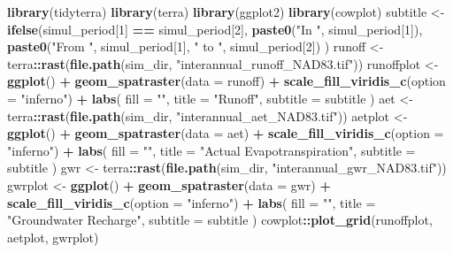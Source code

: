 \documentclass[
]{book}
\newenvironment{Shaded}{\begin{snugshade}}{\end{snugshade}}
\newcommand{\AttributeTok}[1]{\textcolor[rgb]{0.13,0.29,0.53}{#1}}
\newcommand{\DecValTok}[1]{\textcolor[rgb]{0.00,0.00,0.81}{#1}}
\newcommand{\FunctionTok}[1]{\textcolor[rgb]{0.13,0.29,0.53}{\textbf{#1}}}
\newcommand{\NormalTok}[1]{#1}
\newcommand{\OtherTok}[1]{\textcolor[rgb]{0.56,0.35,0.01}{#1}}
\newcommand{\SpecialCharTok}[1]{\textcolor[rgb]{0.81,0.36,0.00}{\textbf{#1}}}
\newcommand{\StringTok}[1]{\textcolor[rgb]{0.31,0.60,0.02}{#1}}
\begin{document}
\begin{Shaded}
\begin{Highlighting}[]
\FunctionTok{library}\NormalTok{(tidyterra)}
\FunctionTok{library}\NormalTok{(terra)}
\FunctionTok{library}\NormalTok{(ggplot2)}
\FunctionTok{library}\NormalTok{(cowplot)}
\NormalTok{subtitle }\OtherTok{\textless{}{-}} \FunctionTok{ifelse}\NormalTok{(simul\_period[}\DecValTok{1}\NormalTok{] }\SpecialCharTok{==}\NormalTok{ simul\_period[}\DecValTok{2}\NormalTok{],}
  \FunctionTok{paste0}\NormalTok{(}\StringTok{"In "}\NormalTok{, simul\_period[}\DecValTok{1}\NormalTok{]),}
  \FunctionTok{paste0}\NormalTok{(}\StringTok{"From "}\NormalTok{, simul\_period[}\DecValTok{1}\NormalTok{], }\StringTok{" to "}\NormalTok{, simul\_period[}\DecValTok{2}\NormalTok{])}
\NormalTok{)}
\NormalTok{runoff }\OtherTok{\textless{}{-}}\NormalTok{ terra}\SpecialCharTok{::}\FunctionTok{rast}\NormalTok{(}\FunctionTok{file.path}\NormalTok{(sim\_dir, }\StringTok{"interannual\_runoff\_NAD83.tif"}\NormalTok{))}
\NormalTok{runoffplot }\OtherTok{\textless{}{-}} \FunctionTok{ggplot}\NormalTok{() }\SpecialCharTok{+}
  \FunctionTok{geom\_spatraster}\NormalTok{(}\AttributeTok{data =}\NormalTok{ runoff) }\SpecialCharTok{+}
  \FunctionTok{scale\_fill\_viridis\_c}\NormalTok{(}\AttributeTok{option =} \StringTok{"inferno"}\NormalTok{) }\SpecialCharTok{+}
  \FunctionTok{labs}\NormalTok{(}
    \AttributeTok{fill =} \StringTok{""}\NormalTok{,}
    \AttributeTok{title =} \StringTok{"Runoff"}\NormalTok{,}
    \AttributeTok{subtitle =}\NormalTok{ subtitle}
\NormalTok{  )}
\NormalTok{aet }\OtherTok{\textless{}{-}}\NormalTok{ terra}\SpecialCharTok{::}\FunctionTok{rast}\NormalTok{(}\FunctionTok{file.path}\NormalTok{(sim\_dir, }\StringTok{"interannual\_aet\_NAD83.tif"}\NormalTok{))}
\NormalTok{aetplot }\OtherTok{\textless{}{-}} \FunctionTok{ggplot}\NormalTok{() }\SpecialCharTok{+}
  \FunctionTok{geom\_spatraster}\NormalTok{(}\AttributeTok{data =}\NormalTok{ aet) }\SpecialCharTok{+}
  \FunctionTok{scale\_fill\_viridis\_c}\NormalTok{(}\AttributeTok{option =} \StringTok{"inferno"}\NormalTok{) }\SpecialCharTok{+}
  \FunctionTok{labs}\NormalTok{(}
    \AttributeTok{fill =} \StringTok{""}\NormalTok{,}
    \AttributeTok{title =} \StringTok{"Actual Evapotranspiration"}\NormalTok{,}
    \AttributeTok{subtitle =}\NormalTok{ subtitle}
\NormalTok{  )}
\NormalTok{gwr }\OtherTok{\textless{}{-}}\NormalTok{ terra}\SpecialCharTok{::}\FunctionTok{rast}\NormalTok{(}\FunctionTok{file.path}\NormalTok{(sim\_dir, }\StringTok{"interannual\_gwr\_NAD83.tif"}\NormalTok{))}
\NormalTok{gwrplot }\OtherTok{\textless{}{-}} \FunctionTok{ggplot}\NormalTok{() }\SpecialCharTok{+}
  \FunctionTok{geom\_spatraster}\NormalTok{(}\AttributeTok{data =}\NormalTok{ gwr) }\SpecialCharTok{+}
  \FunctionTok{scale\_fill\_viridis\_c}\NormalTok{(}\AttributeTok{option =} \StringTok{"inferno"}\NormalTok{) }\SpecialCharTok{+}
  \FunctionTok{labs}\NormalTok{(}
    \AttributeTok{fill =} \StringTok{""}\NormalTok{,}
    \AttributeTok{title =} \StringTok{"Groundwater Recharge"}\NormalTok{,}
    \AttributeTok{subtitle =}\NormalTok{ subtitle}
\NormalTok{  )}
\NormalTok{cowplot}\SpecialCharTok{::}\FunctionTok{plot\_grid}\NormalTok{(runoffplot, aetplot, gwrplot)}
\end{Highlighting}
\end{Shaded}
\end{document}
